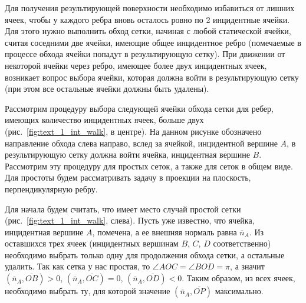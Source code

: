 Для получения результирующей поверхности необходимо избавиться от лишних ячеек, чтобы у каждого ребра вновь осталось ровно по 2 инцидентные ячейки.
Для этого нужно выполнить обход сетки, начиная с любой статической ячейки, считая соседними две ячейки, имеющие общее инцидентное ребро (помечаемые в процессе обхода ячейки попадут в результирующую сетку).
При движении от некоторой ячейки через ребро, имеющее более двух инцидентных ячеек, возникает вопрос выбора ячейки, которая должна войти в результирующую сетку (при этом все остальные ячейки должны быть удалены).

Рассмотрим процедуру выбора следующей ячейки обхода сетки для ребер, имеющих количество инцидентных ячеек, больше двух (рис.~\ref{fig:text_1_int_walk}, в центре).
На данном рисунке обозначено направление обхода слева направо, вслед за ячейкой, инцидентной вершине $A$, в результирующую сетку должна войти ячейка, инцидентная вершине $B$.
Рассмотрим эту процедуру для простых сеток, а также для сеток в общем виде.
Для простоты будем рассматривать задачу в проекции на плоскость, перпендикулярную ребру.

Для начала будем считать, что имеет место случай простой сетки (рис.~\ref{fig:text_1_int_walk}, слева).
Пусть уже известно, что ячейка, инцидентная вершине $A$, помечена, а ее внешняя нормаль равна $\overline{n}_A$.
Из оставшихся трех ячеек (инцидентных вершинам $B$, $C$, $D$ соответственно) необходимо выбрать только одну для продолжения обхода сетки, а остальные удалить.
Так как сетка у нас простая, то $\angle AOC = \angle BOD = \pi$, а значит $(\overline{n}_A, \overline{OB}) > 0$, $(\overline{n}_A, \overline{OC}) = 0$, $(\overline{n}_A, \overline{OD}) < 0$.
Таким образом, из всех ячеек, необходимо выбрать ту, для которой значение $(\overline{n}_A, \overline{OP})$ максимально.

